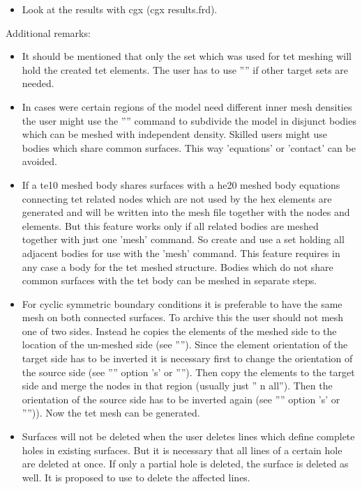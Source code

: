 \documentclass{article}
\begin{document}
\begin{appendix}
\begin{itemize}
\item Look at the results with cgx (cgx results.frd).
\end{itemize}

Additional remarks:
\begin{itemize}
\item It should be mentioned that only the set which was used for tet meshing will hold the created tet elements. The user has to use '''' if other target sets are needed.
\item In cases were certain regions of the model need different inner mesh densities the user might use the  '''' command to subdivide the model in disjunct bodies which can be meshed with independent density. Skilled users might use bodies which share common surfaces. This way 'equations' or 'contact' can be avoided.
\item If a te10 meshed body shares surfaces with a he20 meshed body equations connecting tet related nodes which are not used by the hex elements are generated and will be written into the mesh file together with the nodes and elements. But this feature works only if all related bodies are meshed together with just one 'mesh' command. So create and use a set holding all adjacent bodies for use with the 'mesh' command. This feature requires in any case a body for the tet meshed structure. Bodies which do not share common surfaces with the tet body can be meshed in separate steps.
\item For cyclic symmetric boundary conditions it is preferable to have the same mesh on both connected surfaces. To archive this the user should not mesh one of two sides. Instead he copies the elements of the meshed side to the location of the un-meshed side (see ''''). Since the element orientation of the target side has to be inverted it is necessary first to change the orientation of the source side (see '''' option 's' or ''''). Then copy the elements to the target side and merge the nodes in that region (usually just '' n all''). Then the orientation of the source side has to be inverted again (see '''' option 's' or '''')). Now the tet mesh can be generated.
\item Surfaces will not be deleted when the user deletes lines which define complete holes in existing surfaces. But it is necessary that all lines of a certain hole are deleted at once. If only a partial hole is deleted, the surface is deleted as well. It is proposed to use  to delete the affected lines.

\end{itemize}
\end{appendix}
\end{document}
